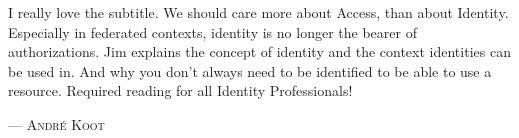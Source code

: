 I really love the subtitle. We should care more about Access, than about Identity. Especially in federated contexts, identity is no longer the bearer of authorizations. Jim explains the concept of identity and the context identities can be used in. And why you don't always need to be identified to be able to use a resource. Required reading for all Identity Professionals! 
\setlength{\parindent}{0cm}\par\textsc{ --- André Koot }\par\vspace{12pt}\setlength{\parindent}{15pt}
